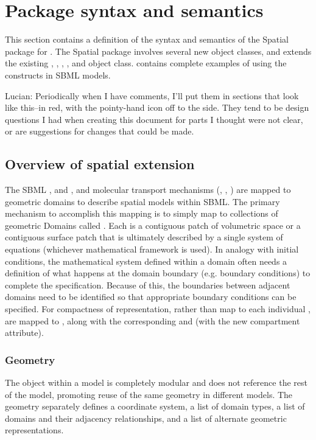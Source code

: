 
\section{Package syntax and semantics}
\label{sec:syntax}

This section contains a definition of the syntax and semantics of the Spatial package for \sbmlthreecore.  The Spatial package involves several new object classes, and extends the existing \Model, \Compartment, \Species, \Reaction, and \Parameter object class.   contains complete examples of using the constructs in SBML models.

{\color{red} Lucian: \notice Periodically when I have comments, I'll put them in sections that look like this--in red, with the pointy-hand icon off to the side.  They tend to be design questions I had when creating this document for parts I thought were not clear, or are suggestions for changes that could be made.}


\subsection{Overview of spatial extension}
The SBML \Compartment, \Reaction and \Species, and molecular transport mechanisms (\DiffusionCoefficient, \AdvectionCoefficient, \BoundaryCondition) are mapped to geometric domains to describe spatial models within SBML.  The primary mechanism to accomplish this mapping is to simply map \Compartments to collections of geometric Domains called \DomainTypes.  Each \Domain is a contiguous patch of volumetric space or a contiguous surface patch that is ultimately described by a single system of equations (whichever mathematical framework is used).  In analogy with initial conditions, the mathematical system defined within a domain often needs a definition of what happens at the domain boundary (e.g. boundary conditions) to complete the specification.  Because of this, the boundaries between adjacent domains need to be identified so that appropriate boundary conditions can be specified.  For compactness of representation, rather than map to each individual \Domain, \Compartments are mapped to \DomainTypes, along with the corresponding \Species and \Reactions (with the new compartment attribute).

\subsubsection{Geometry}
The \Geometry object within a model is completely modular and does not reference the rest of the model, promoting reuse of the same geometry in different models.  The geometry separately defines a coordinate system, a list of domain types, a list of domains and their adjacency relationships, and a list of alternate geometric representations.

